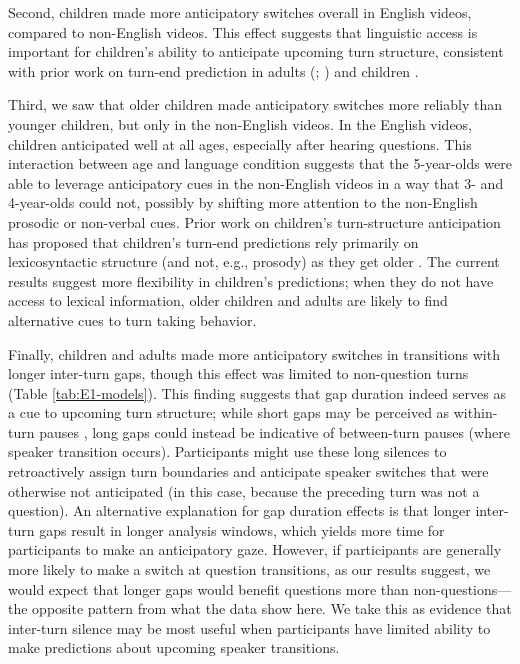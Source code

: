 \documentclass[authoryear, 12pt]{elsarticle}
\begin{document}
Second, children made more anticipatory switches overall in English videos, compared to non-English videos. This effect suggests that linguistic access is important for children's ability to anticipate upcoming turn structure, consistent with prior work on turn-end prediction in adults (\citealp{de-ruiter2006}; \citealp{magyari2012}) and children \citep{keitel2013}.

Third, we saw that older children made anticipatory switches more reliably than younger children, but only in the non-English videos. In the English videos, children anticipated well at all ages, especially after hearing questions. This interaction between age and language condition suggests that the 5-year-olds were able to leverage anticipatory cues in the non-English videos in a way that 3- and 4-year-olds could not, possibly by shifting more attention to the non-English prosodic or non-verbal cues. Prior work on children's turn-structure anticipation has proposed that children's turn-end predictions rely primarily on lexicosyntactic structure (and not, e.g., prosody) as they get older \citep{keitel2013}. The current results suggest more flexibility in children's predictions; when they do not have access to lexical information, older children and adults are likely to find alternative cues to turn taking behavior.

Finally, children and adults made more anticipatory switches in transitions with longer inter-turn gaps, though this effect was limited to non-question turns (Table \ref{tab:E1-models}). This finding suggests that gap duration indeed serves as a cue to upcoming turn structure; while short gaps may be perceived as within-turn pauses \citep{mannel2009}, long gaps could instead be indicative of between-turn pauses (where speaker transition occurs). Participants might use these long silences to retroactively assign turn boundaries and anticipate speaker switches that were otherwise not anticipated (in this case, because the preceding turn was not a question). An alternative explanation for gap duration effects is that longer inter-turn gaps result in longer analysis windows, which yields more time for participants to make an anticipatory gaze. However, if participants are generally more likely to make a switch at question transitions, as our results suggest, we would expect that longer gaps would benefit questions more than non-questions---the opposite pattern from what the data show here. We take this as evidence that inter-turn silence may be most useful when participants have limited ability to make predictions about upcoming speaker transitions.
\end{document}
